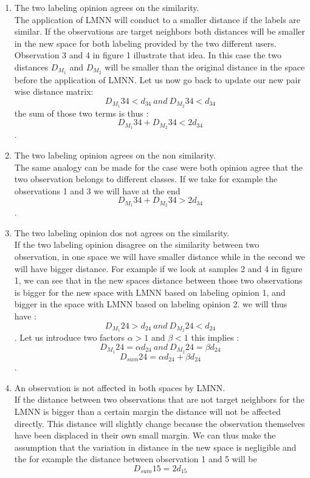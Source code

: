 \documentclass[hidelinks,12pt]{report}
\begin{document}
\begin{enumerate}
\begin{enumerate}
\item The two labeling opinion agrees on the similarity.\\
The application of LMNN will conduct to a smaller distance if the labels are similar. If the observations are target neighbors both distances will be smaller in the new space for both labeling provided by the two different users. Observation 3 and 4 in figure 1 illustrate that idea. In this case the two distances $D_{M_1}$ and $D_{M_2}$ will be smaller than the original distance in the space before the application of LMNN. Let us now go back to update our new pair wise distance matrix: 
$$D_{M_1}34<d_{34}\  and \  D_{M_2}34<d_{34} $$ the sum of those two terms is thus : $$D_{M_1}34+D_{M_2}34<2d_{34}$$.
\item The two labeling opinion agrees on the non similarity.\\
The same analogy can be made for the case were both opinion agree that the two observation belongs to different classes. If we take for example the observations 1 and 3 we will have at the end  $$D_{M_1}34+D_{M_2}34>2d_{34}$$.
\item The two labeling opinion dos not agrees on the similarity.\\
If the two labeling opinion disagree on the similarity between two observation, in one space we will have smaller distance while in the second we will have bigger distance. For example if we look at samples  2 and 4 in figure 1, we can see that in the new spaces distance between those two observations is bigger for the new space with LMNN based on labeling opinion 1, and bigger in the space with LMNN based on labeling opinion 2. we will thus have : $$D_{M_1}24>d_{24} \ and \ D_{M_2}24<d_{24}$$. Let us introduce two factors $\alpha>1$ and $\beta<1$ this implies : $$D_{M_1}24=\alpha d_{24}\ and \ D_{M_2}24=\beta d_{24}$$
$$D_{sum}24=\alpha d_{24}+\beta d_{24}$$. 
\item An observation is not affected in both spaces by LMNN.\\
If the distance between two observations that are not target neighbors for the LMNN is bigger than a certain margin the distance will not be affected directly. This distance will slightly change because the observation themselves have been displaced in their own small margin. We can thus make the assumption that the variation in distance in the new space is negligible and the for example the distance between observation 1 and 5 will be $$D_{sum}15=2d_{15}$$
\end{enumerate}

\end{enumerate}
\end{document}
